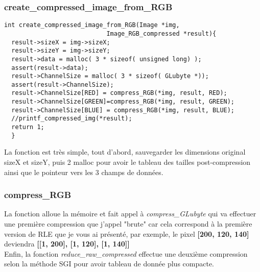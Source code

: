 \documentclass[12pt, letterpaper]{article}
\begin{document}
\subsubsection{create\_compressed\_image\_from\_RGB}
\begin{verbatim}
int create_compressed_image_from_RGB(Image *img,
                            Image_RGB_compressed *result){
  result->sizeX = img->sizeX;
  result->sizeY = img->sizeY;
  result->data = malloc( 3 * sizeof( unsigned long) );
  assert(result->data);
  result->ChannelSize = malloc( 3 * sizeof( GLubyte *));
  assert(result->ChannelSize);
  result->ChannelSize[RED] = compress_RGB(*img, result, RED);
  result->ChannelSize[GREEN]=compress_RGB(*img, result, GREEN);
  result->ChannelSize[BLUE] = compress_RGB(*img, result, BLUE);
  //printf_compressed_img(*result);
  return 1;
  }
\end{verbatim}
La fonction est très simple, tout d'abord, sauvegarder les dimensions original sizeX et sizeY, 
puis 2 malloc pour avoir le tableau des tailles post-compression ainsi que le pointeur vers les 3 champs de données.

\subsubsection{compress\_RGB}
La fonction alloue la mémoire et fait appel à \textit{compress\_GLubyte} qui va effectuer une première compression 
que j'appel "brute" car cela correspond à la première version de RLE que je vous ai présenté, par exemple, le pixel 
\textbf{[200, 120, 140]} deviendra \textbf{[[1, 200], [1, 120], [1, 140]]}\\
Enfin, la fonction \textit{reduce\_raw\_compressed} effectue une deuxième compression selon la méthode SGI pour avoir tableau de donnée plus compacte.
\end{document}
